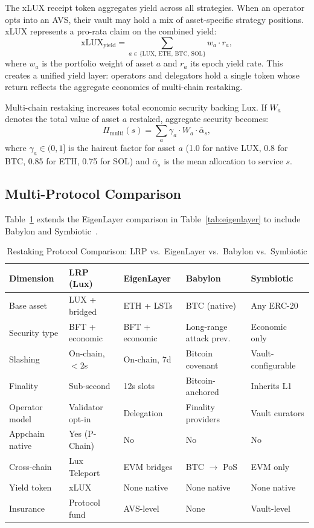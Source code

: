 The xLUX receipt token aggregates yield across all strategies.  When an operator opts into
an AVS, their vault may hold a mix of asset-specific strategy positions.  xLUX
represents a pro-rata claim on the combined yield:
\[
  \text{xLUX}_{\text{yield}} = \sum_{a \in \{\text{LUX, ETH, BTC, SOL}\}}
    w_a \cdot r_a,
\]
where $w_a$ is the portfolio weight of asset $a$ and $r_a$ its epoch yield rate.  This
creates a unified yield layer: operators and delegators hold a single token whose return
reflects the aggregate economics of multi-chain restaking.

Multi-chain restaking increases total economic security backing Lux.  If $W_a$ denotes the
total value of asset $a$ restaked, aggregate security becomes:
\[
  \Pi_{\text{multi}}(s) = \sum_{a} \gamma_a \cdot W_a \cdot \bar{\alpha}_s,
\]
where $\gamma_a \in (0,1]$ is the haircut factor for asset $a$ (1.0 for native LUX,
0.8 for BTC, 0.85 for ETH, 0.75 for SOL) and $\bar{\alpha}_s$ is the mean allocation
to service $s$.

\subsection{Multi-Protocol Comparison}
\label{sec:multicomparison}

Table~\ref{tab:multicompare} extends the EigenLayer comparison in
Table~\ref{tab:eigenlayer} to include Babylon and Symbiotic~\cite{symbiotic2024protocol}.

\begin{table}[H]
\centering
\caption{Restaking Protocol Comparison: LRP vs.\ EigenLayer vs.\ Babylon vs.\ Symbiotic}
\label{tab:multicompare}
\begin{tabular}{p{2.8cm}p{2.6cm}p{2.6cm}p{2.6cm}p{2.6cm}}
\toprule
\textbf{Dimension} & \textbf{LRP (Lux)} & \textbf{EigenLayer} & \textbf{Babylon} & \textbf{Symbiotic} \\
\midrule
Base asset & LUX + bridged & ETH + LSTs & BTC (native) & Any ERC-20 \\
Security type & BFT + economic & BFT + economic & Long-range attack prev. & Economic only \\
Slashing & On-chain, $<$2s & On-chain, 7d & Bitcoin covenant & Vault-configurable \\
Finality & Sub-second & 12s slots & Bitcoin-anchored & Inherits L1 \\
Operator model & Validator opt-in & Delegation & Finality providers & Vault curators \\
Appchain native & Yes (P-Chain) & No & No & No \\
Cross-chain & Lux Teleport & EVM bridges & BTC $\to$ PoS & EVM only \\
Yield token & xLUX & None native & None native & None native \\
Insurance & Protocol fund & AVS-level & None & Vault-level \\
\bottomrule
\end{tabular}
\end{table}

